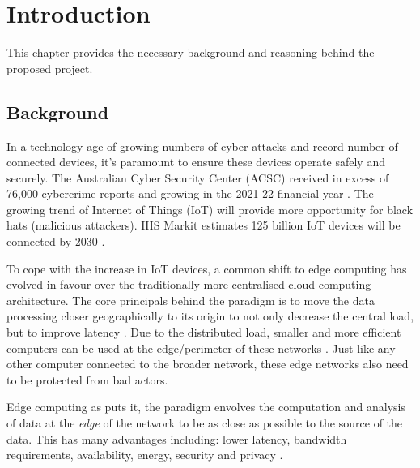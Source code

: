 \chapter[Introduction]{Introduction}
\label{Chap:Intro}




This chapter provides the necessary background and reasoning behind the proposed project. 

\section{Background }


In a technology age of growing numbers of cyber attacks and record number of connected devices, it's 
paramount to ensure these devices operate safely and securely. The Australian Cyber Security Center (ACSC) received in 
excess of 76,000 cybercrime reports and growing in the 2021-22 financial year \cite{acsc_2022}. The growing trend of Internet of Things (IoT) will provide 
more opportunity for black hats (malicious attackers). IHS Markit estimates 125 billion IoT devices will be connected by 2030 \cite{IHS_iot}. 

To cope with the increase in IoT devices, a common shift to edge computing has evolved in favour over the traditionally more centralised cloud computing 
architecture. The core principals behind the paradigm is to move the data processing closer geographically to its origin to not only decrease the 
central load, but to improve latency \cite{EdgeComputingPerspectives}. Due to the distributed load, smaller and more efficient computers can be used 
at the edge/perimeter of these networks \cite{EdgeComputingPerspectives}. Just like any other computer connected to the broader network, these 
edge networks also need to be protected from bad actors.




Edge computing as \cite{EdgeComputing} puts it, the paradigm envolves the computation and analysis of data 
at the \textit{edge} of the network to be as close as possible to the source of the data. This has many advantages including: lower latency, bandwidth requirements,
availability, energy, security and privacy \cite{EdgeComputing}.


